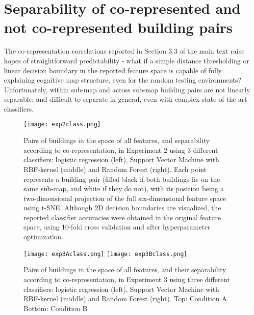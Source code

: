 \section{Separability of co-represented and not co-represented building pairs}

The co-representation correlations reported in Section 3.3 of the main text raise hopes of straightforward predictability - what if a simple distance thresholding or linear decision boundary in the reported feature space is capable of fully explaining cognitive map structure, even for the random testing environments? Unfortunately, within sub-map and across sub-map building pairs are not linearly separable; and difficult to separate in general, even with complex state of the art classifiers. 


\begin{figure}[h]
	\centering
	\texttt{[image: exp2class.png]}
	\caption[Pairs of buildings in the space of all features, and separability, in Experiment 2]{Pairs of buildings in the space of all features, and separability according to co-representation, in Experiment 2 using 3 different classifiers: logistic regression (left), Support Vector Machine with RBF-kernel (middle) and Random Forest (right). Each point represents a building pair (filled black if both buildings lie on the same sub-map, and white if they do not), with its position being a two-dimensional projection of the full six-dimensional feature space using t-SNE.  Although 2D decision boundaries are visualized, the reported classifier accuracies were obtained in the original feature space, using 10-fold cross validation and after hyperparameter optimization.}
	\label{fig_classify}
\end{figure}

\begin{figure}[h]
	\centering
	\texttt{[image: exp3Aclass.png]}
	\texttt{[image: exp3Bclass.png]}
	\caption[Pairs of buildings in the space of all features, and separability, in Experiment 3]{Pairs of buildings in the space of all features, and their separability according to co-representation, in Experiment 3 using three different classifiers: logistic regression (left), Support Vector Machine with RBF-kernel (middle) and Random Forest (right). Top: Condition A. Bottom: Condition B}
	\label{fig_classify_rl}
\end{figure}

